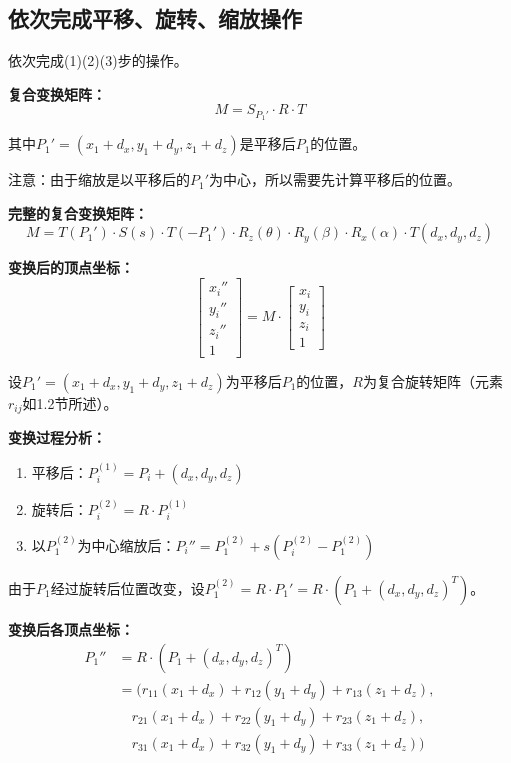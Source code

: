 \documentclass[12pt,a4paper]{article}
\begin{document}
\subsection{依次完成平移、旋转、缩放操作}

依次完成(1)(2)(3)步的操作。

\textbf{复合变换矩阵：}
\[
M = S_{P_1'} \cdot R \cdot T
\]

其中$P_1' = (x_1 + d_x, y_1 + d_y, z_1 + d_z)$是平移后$P_1$的位置。

注意：由于缩放是以平移后的$P_1'$为中心，所以需要先计算平移后的位置。

\textbf{完整的复合变换矩阵：}
\[
M = T(P_1') \cdot S(s) \cdot T(-P_1') \cdot R_z(\theta) \cdot R_y(\beta) \cdot R_x(\alpha) \cdot T(d_x, d_y, d_z)
\]

\textbf{变换后的顶点坐标：}
\[
\begin{bmatrix} x_i'' \\ y_i'' \\ z_i'' \\ 1 \end{bmatrix} = M \cdot \begin{bmatrix} x_i \\ y_i \\ z_i \\ 1 \end{bmatrix}
\]

设$P_1' = (x_1+d_x, y_1+d_y, z_1+d_z)$为平移后$P_1$的位置，$R$为复合旋转矩阵（元素$r_{ij}$如1.2节所述）。

\textbf{变换过程分析：}
\begin{enumerate}
    \item 平移后：$P_i^{(1)} = P_i + (d_x, d_y, d_z)$
    \item 旋转后：$P_i^{(2)} = R \cdot P_i^{(1)}$
    \item 以$P_1^{(2)}$为中心缩放后：$P_i'' = P_1^{(2)} + s(P_i^{(2)} - P_1^{(2)})$
\end{enumerate}

由于$P_1$经过旋转后位置改变，设$P_1^{(2)} = R \cdot P_1' = R \cdot (P_1 + (d_x,d_y,d_z)^T)$。

\textbf{变换后各顶点坐标：}
\begin{align*}
P_1'' &= R \cdot (P_1 + (d_x, d_y, d_z)^T) \\
      &= (r_{11}(x_1+d_x) + r_{12}(y_1+d_y) + r_{13}(z_1+d_z), \\
      &\quad r_{21}(x_1+d_x) + r_{22}(y_1+d_y) + r_{23}(z_1+d_z), \\
      &\quad r_{31}(x_1+d_x) + r_{32}(y_1+d_y) + r_{33}(z_1+d_z))
\end{align*}
\end{document}
